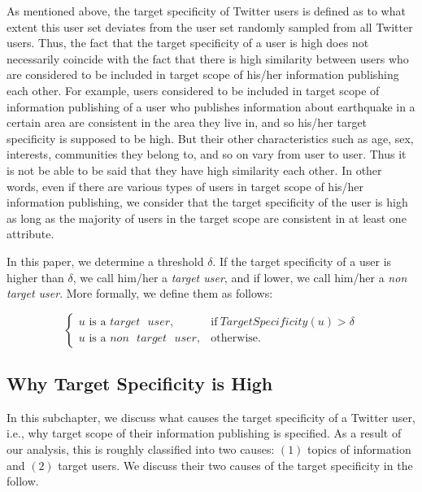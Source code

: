 As mentioned above, the target specificity of Twitter users is defined
as to what extent this user set deviates from the user set randomly
sampled from all Twitter users.  Thus, the fact that the target
specificity of a user is high does not necessarily coincide with the
fact that there is high similarity between users who are considered to
be included in target scope of his/her information publishing each
other.  For example, users considered to be included in target scope of
information publishing of a user who publishes information about
earthquake in a certain area are consistent in the area they live in,
and so his/her target specificity is supposed to be high.  But their
other characteristics such as age, sex, interests, communities they
belong to, and so on vary from user to user.  Thus it is not be able to
be said that they have high similarity each other.  In other words, even
if there are various types of users in target scope of his/her
information publishing, we consider that the target specificity of the
user is high as long as the majority of users in the target scope are
consistent in at least one attribute.

In this paper, we determine a threshold $\delta$. If the target
specificity of a user is higher than $\delta$, we call him/her a
\emph{target user}, and if lower, we call him/her a \emph{non target
user}.  More formally, we define them as follows:

\vspace{-1ex}
\[
  \begin{cases}
   u\mbox{ is a } target\mbox{ }user, & \mbox{if}\
   \mathit{TargetSpecificity}(u) > \delta \\
   u\mbox{ is a }non\mbox{ }target\mbox{ }user, & \mbox{otherwise}.
  \end{cases}
\]
\vspace{-2ex}

\subsection{Why Target Specificity is High}
\label{subsec:The Causes}

In this subchapter, we discuss what causes the target specificity of a
Twitter user, i.e., why target scope of their information publishing is
specified.  As a result of our analysis, this is roughly classified into
two causes: $(1)$ topics of information and $(2)$ target users.  We
discuss their two causes of the target specificity in the follow.

